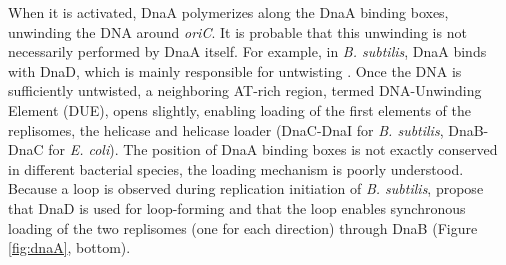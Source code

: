 When it is activated, DnaA polymerizes along the DnaA binding boxes, unwinding the DNA around \textit{oriC}. It is probable that this unwinding is not necessarily performed by DnaA itself. For example, in \textit{B. subtilis}, DnaA binds with DnaD, which is mainly responsible for untwisting \citep{briggs_chromosomal_2012}. Once the DNA is sufficiently untwisted, a neighboring AT-rich region, termed DNA-Unwinding Element (DUE), opens slightly, enabling loading of the first elements of the replisomes, the helicase and helicase loader (DnaC-DnaI for \textit{B. subtilis}, DnaB-DnaC for \textit{E. coli}). The position of DnaA binding boxes is not exactly conserved in different bacterial species, the loading mechanism is poorly understood. Because a loop is observed during replication initiation of \textit{B. subtilis}, \citet{briggs_chromosomal_2012} propose that DnaD is used for loop-forming and that the loop enables synchronous loading of the two replisomes (one for each direction) through DnaB (Figure \ref{fig:dnaA}, bottom).

